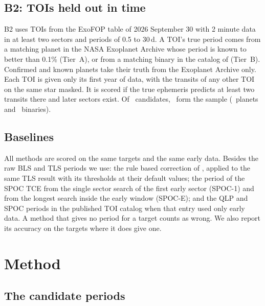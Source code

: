 \documentclass[twocolumn,linenumbers]{aastex701}
\begin{document}
\subsection{B2: TOIs held out in time} \label{sec:b2data}

B2 uses TOIs from the ExoFOP table of 2026 September 30 with 2 minute data in at least two sectors and periods of 0.5 to 30\,d. A TOI's true period comes from a matching planet in the NASA Exoplanet Archive whose period is known to better than 0.1\% (Tier~A), or from a matching binary in the catalog of \citet{Prsa2022} (Tier~B). Confirmed and known planets take their truth from the Exoplanet Archive only. Each TOI is given only its first year of data, with the transits of any other TOI on the same star masked. It is scored if the true ephemeris predicts at least two transits there and later sectors exist. Of \bTwoCands\ candidates, \bTwoN\ form the sample (\bTwoNA\ planets and \bTwoNB\ binaries).

\subsection{Baselines} \label{sec:baselines}

All methods are scored on the same targets and the same early data. Besides the raw BLS and TLS periods we use: the rule based correction of \citet{Tschudi2026a}, applied to the same TLS result with its thresholds at their default values; the period of the SPOC TCE from the single sector search of the first early sector (SPOC-1) and from the longest search inside the early window (SPOC-E); and the QLP and SPOC periods in the published TOI catalog \citep{Guerrero2021} when that entry used only early data. A method that gives no period for a target counts as wrong. We also report its accuracy on the targets where it does give one.

\section{Method} \label{sec:method}

\subsection{The candidate periods} \label{sec:hyp}
\end{document}
